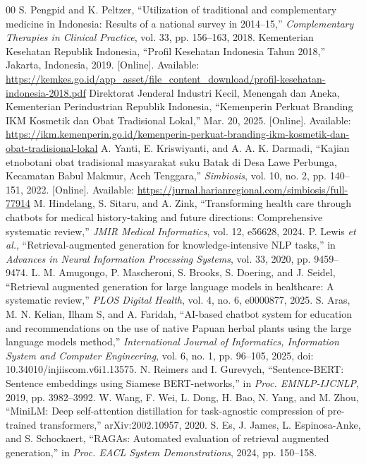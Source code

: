 \documentclass[conference]{IEEEtran}
\begin{document}
\begin{thebibliography}{00}
 S. Pengpid and K. Peltzer, ``Utilization of traditional and complementary medicine in Indonesia: Results of a national survey in 2014--15,'' \emph{Complementary Therapies in Clinical Practice}, vol. 33, pp. 156--163, 2018.
 Kementerian Kesehatan Republik Indonesia, ``Profil Kesehatan Indonesia Tahun 2018,'' Jakarta, Indonesia, 2019. [Online]. Available: \url{https://kemkes.go.id/app_asset/file_content_download/profil-kesehatan-indonesia-2018.pdf}
 Direktorat Jenderal Industri Kecil, Menengah dan Aneka, Kementerian Perindustrian Republik Indonesia, ``Kemenperin Perkuat Branding IKM Kosmetik dan Obat Tradisional Lokal,'' Mar. 20, 2025. [Online]. Available: \url{https://ikm.kemenperin.go.id/kemenperin-perkuat-branding-ikm-kosmetik-dan-obat-tradisional-lokal}
 A. Yanti, E. Kriswiyanti, and A. A. K. Darmadi, ``Kajian etnobotani obat tradisional masyarakat suku Batak di Desa Lawe Perbunga, Kecamatan Babul Makmur, Aceh Tenggara,'' \emph{Simbiosis}, vol. 10, no. 2, pp. 140--151, 2022. [Online]. Available: \url{https://jurnal.harianregional.com/simbiosis/full-77914}
 M. Hindelang, S. Sitaru, and A. Zink, ``Transforming health care through chatbots for medical history-taking and future directions: Comprehensive systematic review,'' \emph{JMIR Medical Informatics}, vol. 12, e56628, 2024.
 P. Lewis \emph{et al.}, ``Retrieval-augmented generation for knowledge-intensive NLP tasks,'' in \emph{Advances in Neural Information Processing Systems}, vol. 33, 2020, pp. 9459--9474.
 L. M. Amugongo, P. Mascheroni, S. Brooks, S. Doering, and J. Seidel, ``Retrieval augmented generation for large language models in healthcare: A systematic review,'' \emph{PLOS Digital Health}, vol. 4, no. 6, e0000877, 2025.
 S. Aras, M. N. Kelian, Ilham S, and A. Faridah, ``AI-based chatbot system for education and recommendations on the use of native Papuan herbal plants using the large language models method,'' \emph{International Journal of Informatics, Information System and Computer Engineering}, vol. 6, no. 1, pp. 96--105, 2025, doi: 10.34010/injiiscom.v6i1.13575.
 N. Reimers and I. Gurevych, ``Sentence-BERT: Sentence embeddings using Siamese BERT-networks,'' in \emph{Proc. EMNLP-IJCNLP}, 2019, pp. 3982--3992.
 W. Wang, F. Wei, L. Dong, H. Bao, N. Yang, and M. Zhou, ``MiniLM: Deep self-attention distillation for task-agnostic compression of pre-trained transformers,'' arXiv:2002.10957, 2020.
 S. Es, J. James, L. Espinosa-Anke, and S. Schockaert, ``RAGAs: Automated evaluation of retrieval augmented generation,'' in \emph{Proc. EACL System Demonstrations}, 2024, pp. 150--158.

\end{thebibliography}
\end{document}
